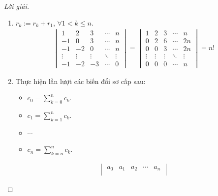 \begin{proof}[Lời giải]
    \begin{enumerate}[label = (\alph*)]
        \item $r_{k}:= r_{k} + r_{1}$, $\forall 1 < k\le n$.
              \begin{align*}
                  \begin{vmatrix}
                      1      & 2      & 3      & \cdots & n      \\
                      -1     & 0      & 3      & \cdots & n      \\
                      -1     & -2     & 0      & \cdots & n      \\
                      \vdots & \vdots & \vdots & \ddots & \vdots \\
                      -1     & -2     & -3     & \cdots & 0
                  \end{vmatrix}
                  =
                  \begin{vmatrix}
                      1      & 2      & 3      & \cdots & n      \\
                      0      & 2      & 6      & \cdots & 2n     \\
                      0      & 0      & 3      & \cdots & 2n     \\
                      \vdots & \vdots & \vdots & \ddots & \vdots \\
                      0      & 0      & 0      & \cdots & n
                  \end{vmatrix}
                  = n!
              \end{align*}
        \item Thực hiện lần lượt các biến đổi sơ cấp sau:
              \begin{itemize}
                  \item $c_{0} = \displaystyle\sum^{n}_{k=0}c_{k}$.
                  \item $c_{1} = \displaystyle\sum^{n}_{k=1}c_{k}$.
                  \item $\cdots$
                  \item $c_{n} = \displaystyle\sum^{n}_{k=n}c_{k}$.
              \end{itemize}
              \begingroup{}
              \allowdisplaybreaks{}
              \begin{align*}
                  \begin{vmatrix}
                      a_{0}  & a_{1}  & a_{2}  & \cdots & a_{n}  \\

\end{vmatrix}
\end{align*}
\end{enumerate}
\end{proof}
